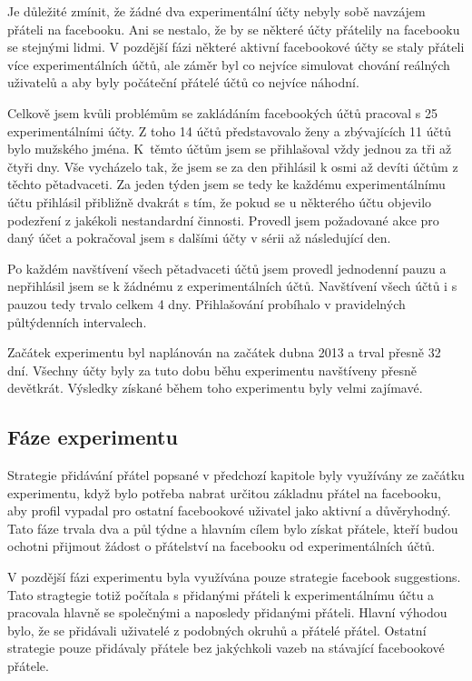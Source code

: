 \documentclass[thesis=M,czech]{FITthesis}[2013/05/10]
\begin{document}
Je důležité zmínit, že žádné dva experimentální účty nebyly sobě navzájem přáteli na facebooku. Ani se nestalo, že by se některé účty přátelily na facebooku se stejnými lidmi. V pozdější fázi některé aktivní facebookové účty se staly přáteli více experimentálních účtů, ale záměr byl co nejvíce simulovat chování reálných uživatelů a aby byly počáteční přátelé účtů co nejvíce náhodní.

Celkově jsem kvůli problémům se zakládáním facebookých účtů pracoval s 25 experimentálními účty. Z toho 14 účtů představovalo ženy a zbývajících 11 účtů bylo mužského jména. K~těmto účtům jsem se přihlašoval vždy jednou za tři až čtyři dny. Vše vycházelo tak, že jsem se za den přihlásil k osmi až devíti účtům z těchto pětadvaceti. Za jeden týden jsem se tedy ke každému experimentálnímu účtu přihlásil přibližně dvakrát s tím, že pokud se u některého účtu objevilo podezření z jakékoli nestandardní činnosti. Provedl jsem požadované akce pro daný účet a pokračoval jsem s dalšími účty v sérii až následující den.

Po každém navštívení všech pětadvaceti účtů jsem provedl jednodenní pauzu a nepřihlásil jsem se k žádnému z experimentálních účtů. Navštívení všech účtů i s pauzou tedy trvalo celkem 4 dny. Přihlašování probíhalo v pravidelných půltýdenních intervalech.

Začátek experimentu byl naplánován na začátek dubna 2013 a trval přesně 32 dní. Všechny účty byly za tuto dobu běhu experimentu navštíveny přesně devětkrát. Výsledky získané během toho experimentu byly velmi zajímavé.

\subsection{Fáze experimentu}

Strategie přidávání přátel popsané v předchozí kapitole byly využívány ze začátku experimentu, když bylo potřeba nabrat určitou základnu přátel na facebooku, aby profil vypadal pro ostatní facebookové uživatel jako aktivní a důvěryhodný. Tato fáze trvala dva a půl týdne a hlavním cílem bylo získat přátele, kteří budou ochotni přijmout žádost o přátelství na facebooku od experimentálních účtů. 

V pozdější fázi experimentu byla využívána pouze strategie facebook suggestions. Tato stragtegie totiž počítala s přidanými přáteli k experimentálnímu účtu a pracovala hlavně se společnými a naposledy přidanými přáteli. Hlavní výhodou bylo, že se přidávali uživatelé z podobných okruhů a přátelé přátel. Ostatní strategie pouze přidávaly přátele bez jakýchkoli vazeb na stávající facebookové přátele. 
\end{document}
